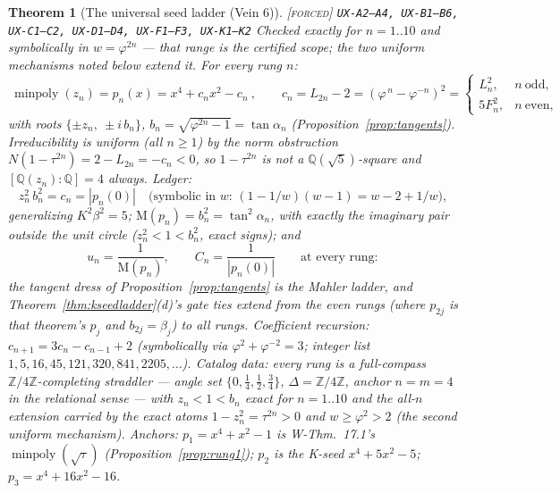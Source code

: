 \documentclass[11pt]{article}
\newcommand{\tagF}{\textcolor{cF}{\textsc{[forced]}}}
\newcommand{\hx}[1]{\textcolor{cC}{\footnotesize\texttt{#1}}}
\newcommand{\Q}{\mathbb{Q}}
\newcommand{\Z}{\mathbb{Z}}
\newcommand{\gp}{\varphi}
\newcommand{\M}{\mathrm{M}}
\theoremstyle{plain}
\newtheorem{theorem}{Theorem}[section]
\theoremstyle{definition}
\theoremstyle{remark}
\begin{document}
\begin{theorem}[The universal seed ladder (Vein 6)]\label{thm:seedladder}\tagF{} \hx{UX-A2--A4, UX-B1--B6, UX-C1--C2, UX-D1--D4, UX-F1--F3, UX-K1--K2}
Checked exactly for $n=1..10$ and symbolically in $w=\gp^{2n}$ --- that
range is the certified scope; the two uniform mechanisms noted below extend
it. For every rung $n$:
\[
\boxed{\ \operatorname{minpoly}(z_n)=p_n(x)=x^4+c_nx^2-c_n\ },
\qquad
c_n=L_{2n}-2=(\gp^{\,n}-\gp^{-n})^2
=\begin{cases}L_n^2,&n\ \text{odd},\\[2pt]5F_n^2,&n\ \text{even},\end{cases}
\]
with roots $\{\pm z_n,\ \pm i\,b_n\}$, $b_n=\sqrt{\gp^{2n}-1}=\tan\alpha_n$
(Proposition~\ref{prop:tangents}). Irreducibility is uniform (all $n\ge1$)
by the norm obstruction $N(1-\tau^{2n})=2-L_{2n}=-c_n<0$, so $1-\tau^{2n}$
is not a $\Q(\sqrt5)$-square and $[\Q(z_n):\Q]=4$ always. Ledger:
\[
z_n^2\,b_n^2=c_n=|p_n(0)|
\quad\text{(symbolic in $w$: $(1-1/w)(w-1)=w-2+1/w$)},
\]
generalizing $K^2\beta^2=5$; $\M(p_n)=b_n^2=\tan^2\alpha_n$, with exactly
the imaginary pair outside the unit circle ($z_n^2<1<b_n^2$, exact signs);
and
\[
u_n=\frac1{\M(p_n)},\qquad C_n=\frac1{|p_n(0)|}\qquad\text{at every rung}:
\]
\emph{the tangent dress of Proposition~\ref{prop:tangents} is the Mahler
ladder}, and Theorem~\ref{thm:kseedladder}(d)'s gate ties extend from the
even rungs (where $p_{2j}$ is that theorem's $p_j$ and $b_{2j}=\beta_j$) to
all rungs. Coefficient recursion: $c_{n+1}=3c_n-c_{n-1}+2$ (symbolically
via $\gp^2+\gp^{-2}=3$; integer list $1,5,16,45,121,320,841,2205,\ldots$).
Catalog data: every rung is a full-compass $\Z/4\Z$-completing straddler
--- angle set $\{0,\tfrac14,\tfrac12,\tfrac34\}$, $\Delta=\Z/4\Z$, anchor
$n=m=4$ in the relational sense --- with $z_n<1<b_n$ exact for $n=1..10$
and the all-$n$ extension carried by the exact atoms $1-z_n^2=\tau^{2n}>0$
and $w\ge\gp^2>2$ (the second uniform mechanism). Anchors: $p_1=x^4+x^2-1$
is W-Thm.\ 17.1's $\operatorname{minpoly}(\sqrt\tau)$
(Proposition~\ref{prop:rung1}); $p_2$ is the K-seed $x^4+5x^2-5$;
$p_3=x^4+16x^2-16$.
\end{theorem}
\end{document}
